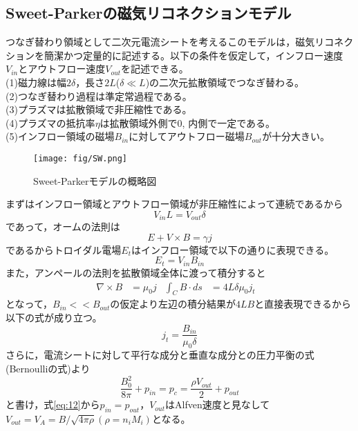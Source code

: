 \subsection{Sweet-Parkerの磁気リコネクションモデル}
つなぎ替わり領域として二次元電流シートを考えるこのモデルは，磁気リコネクションを簡潔かつ定量的に記述する。以下の条件を仮定して，インフロー速度$V_{in}$とアウトフロー速度$V_{out}$を記述できる。\\
(1)磁力線は幅$2\delta$，長さ$2L$($\delta\ll L$)の二次元拡散領域でつなぎ替わる。\\
(2)つなぎ替わり過程は準定常過程である。\\
(3)プラズマは拡散領域で非圧縮性である。\\
(4)プラズマの抵抗率$\eta$は拡散領域外側で$0$, 内側で一定である。\\
(5)インフロー領域の磁場$B_{in}$に対してアウトフロー磁場$B_{out}$が十分大きい。\\
\begin{figure}[H]
	\centering\texttt{[image: fig/SW.png]}
	\caption{Sweet-Parkerモデルの概略図}\label{fig:SW}
\end{figure}
まずはインフロー領域とアウトフロー領域が非圧縮性によって連続であるから
\begin{equation}
	V_{in}L = V_{out}\delta
\end{equation}
であって，オームの法則は
\begin{equation}
	E + V \times B = \gamma j
\end{equation}
であるからトロイダル電場$E_t$はインフロー領域で以下の通りに表現できる。
\begin{equation}
	E_t = V_{in}B_{in}
\end{equation}
また，アンペールの法則を拡散領域全体に渡って積分すると
\begin{align}
	\nabla \times B &= \mu_0 j&
	\int_C B \cdot ds &= 4L\delta \mu_0 j_t&
\end{align}
となって，$B_{in}<<B_{out}$の仮定より左辺の積分結果が$4LB$と直接表現できるから以下の式が成り立つ。
\begin{equation}
	j_t = \frac{B_{in}}{\mu_0 \delta}
\end{equation}
さらに，電流シートに対して平行な成分と垂直な成分との圧力平衡の式(Bernoulliの式)より
\begin{equation}
\frac{B_0^2}{8\pi}+p_{in}=p_c=\frac{\rho V_{out}}{2}+p_{out}
\label{eq:12}
\end{equation}
と書け，式\ref{eq:12}から$p_{in}=p_{out}$，$V_{out}$はAlfven速度と見なして$V_{out}=V_A=B/\sqrt{4\pi\rho}(\rho=n_iM_i)$となる。\\ 
